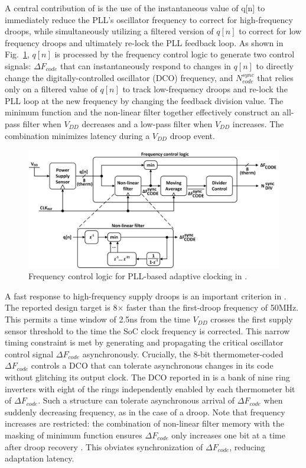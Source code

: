\documentclass[twoside,9pt,journal,letterpage]{IEEEtran}
\begin{document}
A central contribution of \cite{hashimoto2018} is the use of the instantaneous value of q[n] to immediately reduce the PLL's oscillator frequency to correct for high-frequency droops, while simultaneously utilizing a filtered version of $q[n]$ to correct for low frequency droops and ultimately re-lock the PLL feedback loop. As shown in Fig.\ \ref{fig:detail_pll}, $q[n]$ is processed by the frequency control logic to generate two control signals: $\Delta F_{code}$ that can instantaneously respond to changes in $q[n]$ to directly change the digitally-controlled oscillator (DCO) frequency, and $N^{sync}_{code}$ that relies only on a filtered value of $q[n]$ to track low-frequency droops and re-lock the PLL loop at the new frequency by changing the feedback division value. The minimum function and the non-linear filter together effectively construct an all-pass filter when $V_{DD}$ decreases and a low-pass filter when $V_{DD}$ increases. The combination minimizes latency during a $V_{DD}$ droop event. 

\begin{figure}[h]
	\centering
	\includegraphics[width=\columnwidth]{fig_detail_pll}
	\caption{Frequency control logic for PLL-based adaptive clocking in \cite{hashimoto2018}.}
	\label{fig:detail_pll}
\end{figure}

A fast response to high-frequency supply droops is an important criterion in \cite{hashimoto2018}. The reported design target is 8$\times$ faster than the first-droop frequency of 50MHz. This permits a time window of 2.5ns from the time $V_{DD}$ crosses the first supply sensor threshold to the time the SoC clock frequency is corrected. This narrow timing constraint is met by generating and propagating the critical oscillator control signal $\Delta F_{code}$ asynchronously. Crucially, the 8-bit thermometer-coded $\Delta F_{code}$ controls a DCO that can tolerate asynchronous changes in its code without glitching its output clock. The DCO reported in \cite{hashimoto2018} is a bank of nine ring inverters with eight of the rings independently enabled by each thermometer bit of $\Delta F_{code}$. Such a structure can tolerate asynchronous arrival of $\Delta F_{code}$ when suddenly decreasing frequency, as in the case of a droop. Note that frequency increases are restricted: the combination of non-linear filter memory with the masking of minimum function ensures $\Delta F_{code}$ only increases one bit at a time after droop recovery \cite{hashimoto2018}. This obviates synchronization of $\Delta F_{code}$, reducing adaptation latency.
\end{document}

